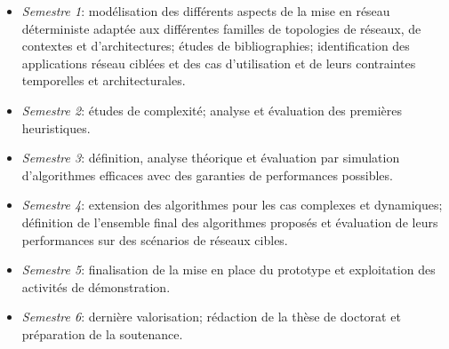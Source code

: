 \documentclass{article}
\begin{document}
\begin{itemize}
\item {\it Semestre 1}: modélisation des différents aspects de la mise en réseau déterministe adaptée aux différentes familles de topologies de réseaux, de contextes et d'architectures; études de bibliographies; identification des applications réseau ciblées et des cas d'utilisation et de leurs contraintes temporelles et architecturales.
 \item {\it Semestre 2}: études de complexité; analyse et évaluation des premières heuristiques.
 \item {\it Semestre 3}: définition, analyse théorique et évaluation par simulation d'algorithmes efficaces avec des garanties de performances possibles.
 \item {\it Semestre 4}: extension des algorithmes pour les cas complexes et dynamiques; définition de l'ensemble final des algorithmes proposés et évaluation de leurs performances sur des scénarios de réseaux cibles.
 \item {\it Semestre 5}: finalisation de la mise en place du prototype et exploitation des activités de démonstration.
 \item {\it Semestre 6}: dernière valorisation; rédaction de la thèse de doctorat et préparation de la soutenance.
  \end {itemize}



\end{document}
